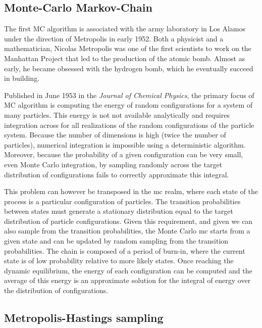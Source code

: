 \subsection{Monte-Carlo Markov-Chain}

The first \acrshort{MC} algorithm is associated with the army laboratory in Los Alamos under the direction of Metropolis in early 1952.
Both a physicist and a mathematician, Nicolas Metropolis was one of the first scientists to work on the Manhattan Project that led to the production of the atomic bomb.
Almost as early, he became obsessed with the hydrogen bomb, which he eventually succeed in building.

Published in June 1953 in the \textit{Journal of Chemical Physics}, the primary focus of \acrshort{MC} algorithm is computing the energy of random configurations for a system of many particles.
This energy is not not available analytically and requires integration across for all realizations of the random configurations of the particle system.
Because the number of dimensions is high (twice the number of particles), numerical integration is impossible using a deterministic algorithm.
Moreover, because the probability of a given configuration can be very small, even Monte Carlo integration, by sampling randomly across the target distribution of configurations fails to correctly approximate this integral.

This problem can however be transposed in the \gls{mc} realm, where each state of the process is a particular configuration of particles.
The {transition} probabilities between states must generate a stationary distribution equal to the target distribution of particle configurations.
Given this requirement, and given we can also sample from the {transition} probabilities, the Monte Carlo \gls{mc} starts from a given state and can be updated by random sampling from the {transition} probabilities.
The chain is composed of a period of burn-in, where the current state is of low probability relative to more likely states.
Once reaching the dynamic equilibrium, the energy of each configuration can be computed and the average of this energy is an approximate solution for the integral of energy over the distribution of configurations.


\subsection{Metropolis-Hastings sampling}


